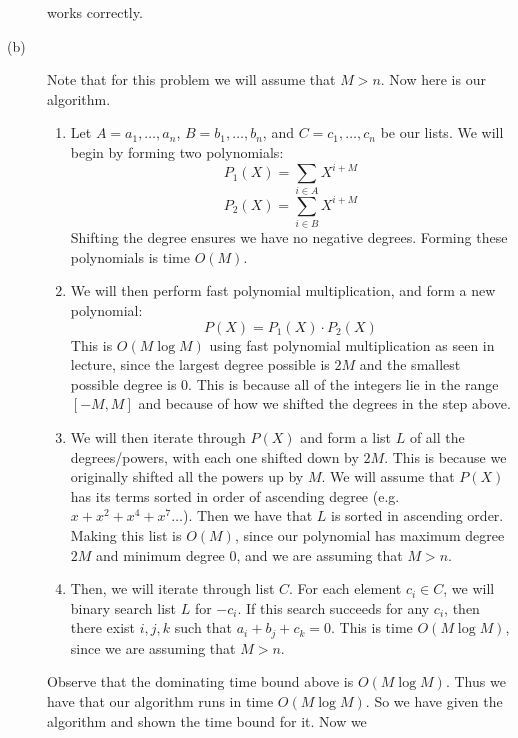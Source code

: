 \documentclass{article}
\begin{document}
\begin{description}
        works correctly.
    \item[(b)]
        Note that for this problem we will assume that $M > n$. Now here is our
        algorithm.
        \begin{enumerate}
            \item Let $A = a_1, \dots, a_n$,
                $B = b_1, \dots, b_n$, and $C = c_1, \dots, c_n$ be our lists.
                We will begin by forming two polynomials:
                \[ P_1(X) = \sum_{i \in A} X^{i+M} \]
                \[ P_2(X) = \sum_{i \in B} X^{i+M} \]
                Shifting the degree ensures we have no negative degrees. Forming
                these polynomials is time $O(M)$.
            \item We will then perform fast polynomial multiplication, and form a new
                polynomial:
                \[ P(X) = P_1(X) \cdot P_2(X) \]
                This is $O(M \log M)$ using fast polynomial multiplication as
                seen in lecture, since the largest degree possible is $2M$
                and the smallest possible degree is $0$. This is because
                all of the integers lie in the range $[-M, M]$ and because of
                how we shifted the degrees in the step above.
            \item We will then iterate through $P(X)$ and form a list $L$ of all
                the degrees/powers, with each one shifted down by $2M$. This
                is because we originally shifted all the powers up by $M$.
                We will assume that $P(X)$ has its terms
                sorted in order of ascending degree (e.g. $x + x^2 + x^4 + x^7
                \dots$). Then we have that $L$ is sorted in ascending order.
                Making this list is $O(M)$, since our polynomial has maximum
                degree $2M$ and minimum degree $0$, and we are assuming that
                $M > n$.
            \item Then, we will iterate through list $C$. For each element $c_i
                \in C$, we will binary search list $L$ for $-c_i$. If this
                search succeeds for any $c_i$, then there exist $i,j,k$ such that
                $a_i + b_j + c_k = 0$. This is time $O(M \log M)$, since we are
                assuming that $M>n$.
        \end{enumerate}
        Observe that the dominating time bound above is $O(M \log M)$. Thus we have
        that our algorithm runs in time $O(M \log M)$.
        So we have given the algorithm and shown the time bound for it. Now we

\end{description}
\end{document}
